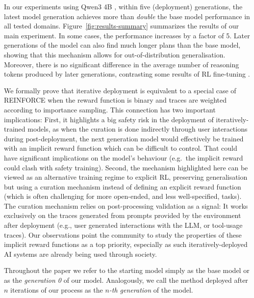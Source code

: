 In our experiments using Qwen3 4B \citep{qwen3-tr}, within five (deployment) generations, the
latest model generation achieves more than \emph{double} the base model
performance in all tested domains. Figure~\ref{fig:results-summary} summarizes
the results of our main experiment. In some cases, the performance increases by
a factor of 5. Later generations of the model can also find much longer plans
than the base model, showing that this mechanism allows for out-of-distribution
generalisation. Moreover, there is no significant difference in the average
number of reasoning tokens produced by later generations, contrasting some
results of RL fine-tuning \cite{deepseek-arxiv2025}.

We formally prove that iterative deployment is equivalent to a special case of
REINFORCE \cite{williams-jml1992} when the reward function is binary and traces
are weighted according to importance sampling.
This connection has two important implications: First, it highlights a big safety risk in the deployment of iteratively-trained models, as when the curation is done indirectly through user interactions during post-deployment, the next generation model would effectively be trained with an implicit reward function which can be difficult to control. That could have significant implications on the model's behaviour (e.g.\ the implicit reward could clash with safety training).
Second, the mechanism highlighted here can be viewed as an alternative training regime to explicit RL, preserving generalisation but using a curation mechanism instead of defining an explicit reward
function (which is often challenging for more open-ended, and less
well-specified, tasks). The curation mechanism relies on post-processing validation as a
signal: It works exclusively on the traces generated from prompts provided by
the environment after deployment (e.g., user generated interactions with the
LLM, or tool-usage traces).
Our
observations point the community to study the properties of these implicit reward functions as a
top priority, especially as such iteratively-deployed AI systems are already being used through society.

Throughout the paper we refer to the starting model simply as the base model or as the
\emph{generation 0} of our model. Analogously, we call the method deployed after
$n$ iterations of our process as the \emph{$n$-th generation} of the model.
